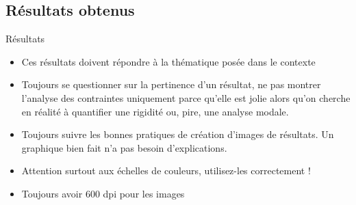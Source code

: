 \subsection{Résultats obtenus}
\label{sec:Résultats obtenus}

\begin{frame}[c]{Résultats}
    \begin{itemize}
        \item Ces résultats doivent répondre à la thématique posée dans le contexte
        \item Toujours se questionner sur la pertinence d'un résultat, ne pas montrer l'analyse des contraintes uniquement parce qu'elle est jolie alors qu'on cherche en réalité à quantifier une rigidité ou, pire, une analyse modale.
        \item Toujours suivre les bonnes pratiques de création d'images de résultats. Un graphique bien fait n'a pas besoin d'explications.
        \item Attention surtout aux échelles de couleurs, utilisez-les correctement !
        \item Toujours avoir 600 dpi pour les images
    \end{itemize}
\end{frame}
